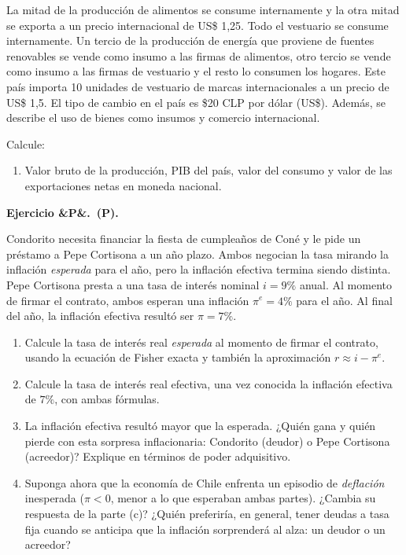 \documentclass[11pt]{article}
\newcounter{ejercicio}
\newcommand{\ejercicio}[1][]{%
  \stepcounter{ejercicio}%
  \bigskip\noindent\textbf{Ejercicio \arabic{ejercicio}\ifx&#1&\relax.\else\ (#1).\fi}\ %
}
\newenvironment{partes}
  {\begin{enumerate}[label=(\alph*), leftmargin=1.5cm]}
  {\end{enumerate}}
\begin{document}
La mitad de la producción de alimentos se consume internamente y la otra mitad se exporta a un precio internacional de US\$ 1,25. Todo el vestuario se consume internamente. Un tercio de la producción de energía que proviene de fuentes renovables se vende como insumo a las firmas de alimentos, otro tercio se vende como insumo a las firmas de vestuario y el resto lo consumen los hogares. Este país importa 10 unidades de vestuario de marcas internacionales a un precio de US\$ 1,5. El tipo de cambio en el país es \$20 CLP por dólar (US\$). Además, se describe el uso de bienes como insumos y comercio internacional.

Calcule:

\begin{partes}
  \item Valor bruto de la producción, PIB del país, valor del consumo y valor de las exportaciones netas en moneda nacional.
\end{partes}



\ejercicio[P]
Condorito necesita financiar la fiesta de cumpleaños de Coné y le pide un préstamo a Pepe Cortisona a un año plazo. Ambos negocian la tasa mirando la inflación \textit{esperada} para el año, pero la inflación efectiva termina siendo distinta. Pepe Cortisona presta a una tasa de interés nominal $i = 9\%$ anual. Al momento de firmar el contrato, ambos esperan una inflación $\pi^e = 4\%$ para el año. Al final del año, la inflación efectiva resultó ser $\pi = 7\%$.

\begin{partes}
  \item Calcule la tasa de interés real \textit{esperada} al momento de firmar el contrato, usando la ecuación de Fisher exacta y también la aproximación $r \approx i - \pi^e$.
  \item Calcule la tasa de interés real efectiva, una vez conocida la inflación efectiva de $7\%$, con ambas fórmulas.

  \item La inflación efectiva resultó mayor que la esperada. ¿Quién gana y quién pierde con esta sorpresa inflacionaria: Condorito (deudor) o Pepe Cortisona (acreedor)? Explique en términos de poder adquisitivo.
  \item Suponga ahora que la economía de Chile enfrenta un episodio de \textit{deflación} inesperada ($\pi < 0$, menor a lo que esperaban ambas partes). ¿Cambia su respuesta de la parte (c)? ¿Quién preferiría, en general, tener deudas a tasa fija cuando se anticipa que la inflación sorprenderá al alza: un deudor o un acreedor?
\end{partes}
\end{document}
